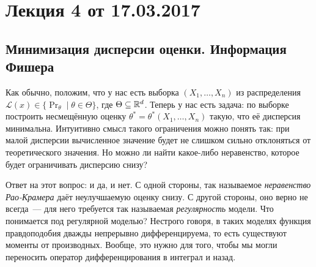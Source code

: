 \section{Лекция 4 от 17.03.2017}
\subsection{Минимизация дисперсии оценки. Информация Фишера}
Как обычно, положим, что у нас есть выборка \((X_{1}, \dots, X_{n})\) из 
распределения \(\mathcal{L}(x) \in \{\Pr_{\theta} \mid \theta \in \Theta\}\), 
где \(\Theta \subseteq \mathbb{R}^{d}\). Теперь у нас есть задача: по выборке построить 
несмещённую оценку \(\theta^{*} = \theta^{*}(X_{1}, \dots, X_{n})\) такую, что 
её дисперсия минимальна. Интуитивно смысл такого ограничения можно понять так: 
при малой дисперсии вычисленное значение будет не слишком сильно отклоняться от 
теоретического значения. Но можно ли найти какое-либо неравенство, которое 
будет ограничивать дисперсию снизу?

Ответ на этот вопрос: и да, и нет. С одной стороны, так называемое 
\emph{неравенство Рао-Крамера} даёт неулучшаемую оценку снизу. С другой 
стороны, оно верно не всегда~--- для него требуется так называемая 
\emph{регулярность} модели. Что понимается под регулярной моделью? Нестрого 
говоря, в таких моделях функция правдоподобия дважды непрерывно 
дифференцируема, то есть существуют моменты от производных. Вообще, это нужно 
для того, чтобы мы могли переносить оператор дифференцирования в интеграл и 
назад.


